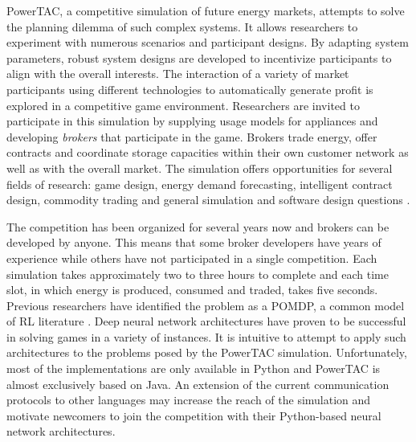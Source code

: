 \ac{PowerTAC}, a competitive simulation of future energy markets, attempts to solve the planning dilemma of such
complex systems. It allows researchers to experiment with numerous scenarios and participant designs. By adapting system
parameters, robust system designs are developed to incentivize participants to align with the overall
interests. The interaction of a variety of market participants using different technologies to automatically generate
profit is explored in a competitive game environment. Researchers are invited to participate in this simulation by
supplying usage models for appliances and developing \emph{brokers} that participate in the game.  Brokers trade energy,
offer contracts and coordinate storage capacities within their own customer network as well as with the overall market.
The simulation offers opportunities for several fields of research: game design, energy demand forecasting,
intelligent contract design, commodity trading and general simulation and software design questions
\cite[]{ketter2015competitive, ketter2018powertac}.

The competition has been organized for several years now and brokers can be developed by anyone. This means that some
broker developers have years of experience while others have not participated in a single competition. Each simulation
takes approximately two to three hours to complete and each time slot, in which energy is produced, consumed and
traded, takes five seconds. Previous researchers have
identified the problem as a \ac{POMDP}, a common model of \ac{RL} literature \cite[]{tactexurieli2016mdp}. Deep neural network
architectures have proven to be successful in solving games in a variety of instances. It is intuitive to
attempt to apply such architectures to the problems posed by the \ac{PowerTAC} simulation. Unfortunately, most of the
implementations are only available in Python \cite[]{baselines, plappert2016kerasrl, schaarschmidt2017tensorforce}  and
\ac{PowerTAC} is almost exclusively based on Java. An extension of the current communication protocols to other
languages may increase the reach of the simulation and motivate newcomers to join the competition with
their Python-based neural network architectures.

